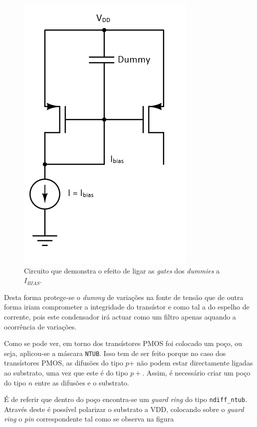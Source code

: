 \documentclass[11pt]{article}
\numberwithin{equation}{section}
\begin{document}
\begin{figure}[H]
	\centering
	\includegraphics[keepaspectratio=true, scale=0.45]{exps/circuito_ibias}
	\vspace{-0.5em}
	\caption{Circuito que demonstra o efeito de ligar as \textit{gates} dos \textit{dummies} a $I_{BIAS}$.}
	\vspace{-0.8em}
\end{figure}

Desta forma protege-se o \textit{dummy} de variações na fonte de tensão que de outra forma iriam comprometer a integridade do transístor e como tal a do espelho de corrente, pois este condensador irá actuar como um filtro apenas aquando a ocorrência de variações.

Como se pode ver, em torno dos transístores PMOS foi colocado um poço, ou seja, aplicou-se a máscara \texttt{NTUB}. Isso tem de ser feito porque no caso dos transístores PMOS, as difusões do tipo $p$+ não podem estar directamente ligadas ao substrato, uma vez que este é do tipo $p+$. Assim, é necessário criar um poço do tipo $n$ entre as difusões e o substrato.

É de referir que dentro do poço encontra-se um \textit{guard ring} do tipo \texttt{ndiff\_ntub}. Através deste é possível polarizar o substrato a VDD, colocando sobre o \textit{guard ring} o \textit{pin} correspondente tal como se observa na figura
\end{document}
